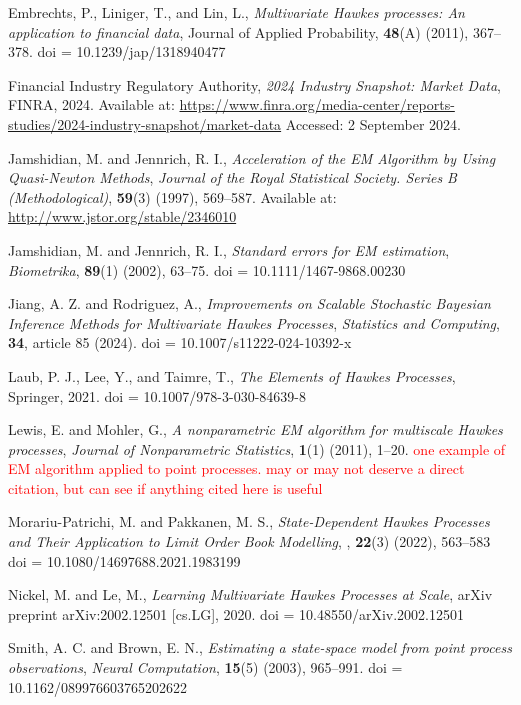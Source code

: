 \documentclass[honours,12pt]{unswthesis}
\numberwithin{equation}{section}
\begin{document}
\begin{thebibliography}{999}
Embrechts, P., Liniger, T., and Lin, L.,
\textit{Multivariate Hawkes processes: An application to financial data},
Journal of Applied Probability, \textbf{48}(A) (2011), 367--378.
doi = {10.1239/jap/1318940477}

Financial Industry Regulatory Authority,
\textit{2024 Industry Snapshot: Market Data},
FINRA, 2024.
Available at: \url{https://www.finra.org/media-center/reports-studies/2024-industry-snapshot/market-data}
Accessed: 2 September 2024.

Jamshidian, M. and Jennrich, R. I.,
\textit{Acceleration of the EM Algorithm by Using Quasi-Newton Methods},
\textit{Journal of the Royal Statistical Society. Series B (Methodological)},
\textbf{59}(3) (1997), 569--587.
Available at: \url{http://www.jstor.org/stable/2346010}

Jamshidian, M. and Jennrich, R. I.,
\textit{Standard errors for EM estimation},
\textit{Biometrika},
\textbf{89}(1) (2002), 63--75.
doi = {10.1111/1467-9868.00230}

Jiang, A. Z. and Rodriguez, A.,
\textit{Improvements on Scalable Stochastic Bayesian Inference Methods for Multivariate Hawkes Processes},
\textit{Statistics and Computing},
\textbf{34}, article 85 (2024).
doi = {10.1007/s11222-024-10392-x}

Laub, P. J., Lee, Y., and Taimre, T.,
\textit{The Elements of Hawkes Processes},
Springer, 2021.
doi = {10.1007/978-3-030-84639-8}

Lewis, E. and Mohler, G.,
\textit{A nonparametric EM algorithm for multiscale Hawkes processes},
\textit{Journal of Nonparametric Statistics},
\textbf{1}(1) (2011), 1--20.
\textcolor{red}{one example of EM algorithm applied to point processes.  may or may not deserve a direct citation, but can see if anything cited here is useful}

Morariu-Patrichi, M. and Pakkanen, M. S.,
\textit{State-Dependent Hawkes Processes and Their Application to Limit Order Book Modelling},
,
\textbf{22}(3) (2022), 563--583
doi = {10.1080/14697688.2021.1983199}

Nickel, M. and Le, M.,
\textit{Learning Multivariate Hawkes Processes at Scale},
arXiv preprint arXiv:2002.12501 [cs.LG], 2020.
doi = {10.48550/arXiv.2002.12501}

Smith, A. C. and Brown, E. N.,
\textit{Estimating a state-space model from point process observations},
\textit{Neural Computation},
\textbf{15}(5) (2003), 965--991.
doi = {10.1162/089976603765202622}


\end{thebibliography}
\end{document}
